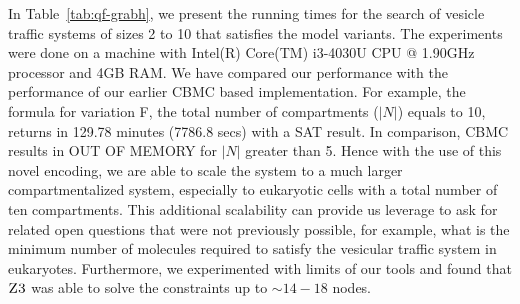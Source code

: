 In Table~\ref{tab:qf-grabh}, we present the running times for the search of
vesicle traffic systems of sizes 2 to 10 that satisfies the model
variants.
%
The experiments were done on a machine with Intel(R) Core(TM) i3-4030U
CPU @ 1.90GHz processor and 4GB RAM.
%
We have compared our performance with the performance of our earlier 
CBMC based implementation.
%
For example, the formula for variation F, the total number of
compartments ($|N|$) equals to 10, returns in 129.78 minutes (7786.8 secs)
with a SAT result.
%
In comparison, CBMC results in OUT OF MEMORY for $|N|$ greater than 5.
%
Hence with the use of this novel encoding, we are able to scale the
system to a much larger compartmentalized system, especially to
eukaryotic cells with a total number of ten compartments.
%
This additional scalability can provide us leverage to ask for related
open questions that were not previously possible, for example, what is
the minimum number of molecules required to satisfy the vesicular
traffic system in eukaryotes.
%
Furthermore, we experimented with limits of our tools and found
that $\textsc{Z3}$ was able to solve the constraints up to $\sim{14-18}$ nodes.



% 






